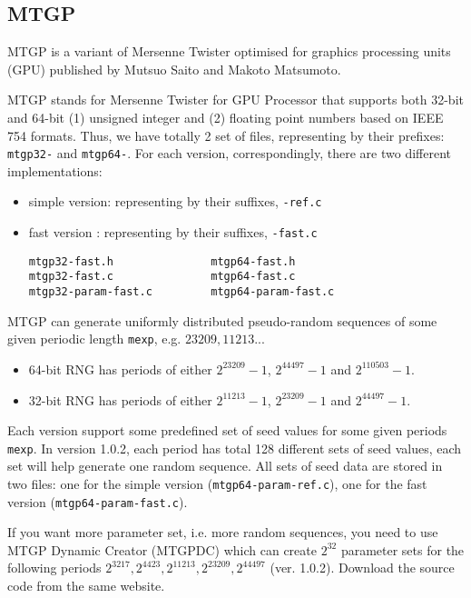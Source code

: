 \subsection{MTGP}
\label{sec:mtgp}

MTGP is a variant of Mersenne Twister optimised for graphics processing units (GPU)
published by Mutsuo Saito and Makoto Matsumoto.

MTGP stands for Mersenne Twister for GPU Processor that supports both
32-bit and 64-bit (1) unsigned integer and (2) floating point numbers
based on IEEE 754 formats. Thus, we have totally 2 set of files,
representing by their prefixes: \verb!mtgp32-! and \verb!mtgp64-!.
For each version, correspondingly, there are two different
implementations:
\begin{itemize}
\item simple version: representing by their suffixes, \verb!-ref.c!
\item fast version : representing by their suffixes, \verb!-fast.c!
\begin{verbatim}
mtgp32-fast.h               mtgp64-fast.h
mtgp32-fast.c               mtgp64-fast.c
mtgp32-param-fast.c         mtgp64-param-fast.c
\end{verbatim}
\end{itemize}

MTGP can generate uniformly distributed pseudo-random sequences of
some given periodic length \verb!mexp!, e.g. ${23209}, {11213}$...
\begin{itemize}
\item 64-bit RNG has periods of either $2^{23209}-1$, $2^{44497}-1$
  and $2^{110503}-1$.
\item 32-bit RNG has periods of either $2^{11213}-1$, $2^{23209}-1$
  and $2^{44497}-1$.
\end{itemize}
Each version support some predefined set of seed values for some given
periods \verb!mexp!. In version 1.0.2, each period has total 128
different sets of seed values, each set will help generate one random
sequence. All sets of seed data are stored in two files: one for the
simple version (\verb!mtgp64-param-ref.c!), one for the fast version
(\verb!mtgp64-param-fast.c!).

\begin{framed}
  If you want more parameter set, i.e. more random sequences, you need
  to use MTGP Dynamic Creator (MTGPDC) which can create $2^{32}$
  parameter sets for the following periods $2^{3217}, 2^{4423},
  2^{11213}, 2^{23209}, 2^{44497}$ (ver. 1.0.2). Download the source
  code from the same website.
\end{framed}

